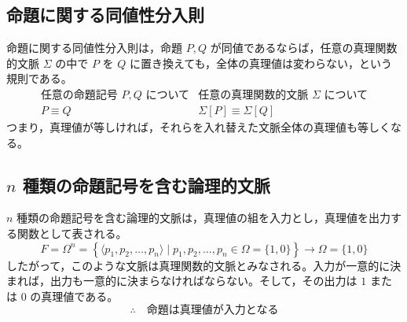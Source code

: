 \documentclass[../main.tex]{subfiles}
\begin{document}
\subsection{命題に関する同値性分入則}

命題に関する同値性分入則は，命題 \(P,Q\) が同値であるならば，任意の真理関数的文脈 \(\Sigma\) の中で \(P\) を \(Q\) に置き換えても，全体の真理値は変わらない，という規則である。
\[
  \begin{array}{c|c}
    \text{任意の命題記号 } P,Q \text{ について}
    &
    \text{任意の真理関数的文脈 } \Sigma \text{ について}
    \\ \hline
    P \equiv Q
    &
    \Sigma[P] \equiv \Sigma[Q]
  \end{array}
\]
つまり，真理値が等しければ，それらを入れ替えた文脈全体の真理値も等しくなる。

\begin{center}
\end{center}

\subsection{\texorpdfstring{\(n\)}{n} 種類の命題記号を含む論理的文脈}

\(n\) 種類の命題記号を含む論理的文脈は，真理値の組を入力とし，真理値を出力する関数として表される。
\[
  F
  =
  \Omega^n
  =
  \left\{
    \langle p_1,p_2,\ldots,p_n\rangle
    \mid
    p_1,p_2,\ldots,p_n \in \Omega = \{1,0\}
  \right\}
  \longrightarrow
  \Omega = \{1,0\}
\]
したがって，このような文脈は真理関数的文脈とみなされる。入力が一意的に決まれば，出力も一意的に決まらなければならない。そして，その出力は \(1\) または \(0\) の真理値である。
\[
  \therefore
  \quad
  \text{命題は真理値が入力となる}
\]
\end{document}
